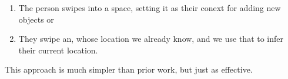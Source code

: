 \begin{enumerate}
\item The person swipes into a space, setting it as their conext for adding new objects or
\item They swipe an, whose location we already know, and we use that to infer their current location.
\end{enumerate}

This approach is much simpler than prior work, but just as effective.  







